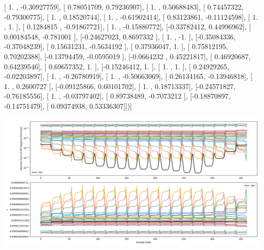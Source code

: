 \documentclass{article}
\begin{document}
       [ 1.        , -0.30927759],
       [ 0.78051709,  0.79236907],
       [ 1.        ,  0.50688483],
       [ 0.74457322, -0.79300775],
       [ 1.        ,  0.18520744],
       [ 1.        , -0.61902414],
       [ 0.83123861, -0.11124598],
       [ 1.        ,  1.        ],
       [ 0.1284815 , -0.91867721],
       [ 1.        , -0.15880772],
       [-0.33782412,  0.44996962],
       [ 0.00184548, -0.781001  ],
       [-0.24627023,  0.8697332 ],
       [ 1.        , -1.        ],
       [-0.35084336, -0.37048239],
       [ 0.15631231, -0.5634192 ],
       [ 0.37936047,  1.        ],
       [ 0.75812195,  0.70202388],
       [-0.13794459, -0.0595019 ],
       [-0.0664232 ,  0.45221817],
       [ 0.46920687,  0.64239546],
       [ 0.69657352,  1.        ],
       [-0.15246412,  1.        ],
       [ 1.        ,  1.        ],
       [ 0.24929265, -0.02203897],
       [ 1.        , -0.26780919],
       [ 1.        , -0.50663069],
       [ 0.26134165, -0.13946818],
       [ 1.        ,  0.2600727 ],
       [-0.09125866,  0.60101702],
       [ 1.        ,  0.18713337],
       [-0.24571827, -0.76185556],
       [ 1.        , -0.03797402],
       [ 0.89738489, -0.7073212 ],
       [-0.18870897, -0.14751479],
       [ 0.09374938,  0.53336307]])]
\begin{center}
\includegraphics[scale=.9]{report_pickled_controls231/control_dpn_all.png}

\end{center}
\end{document}

